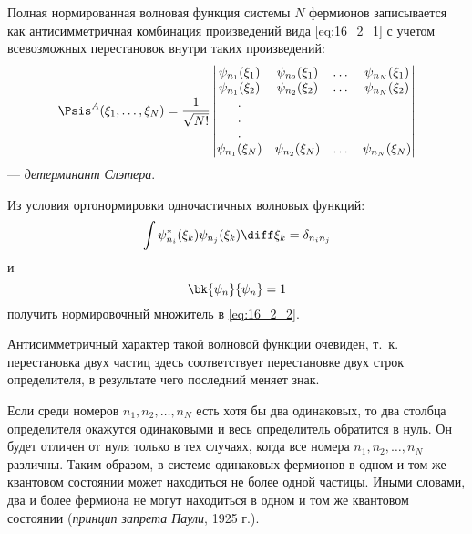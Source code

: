 Полная нормированная волновая функция системы $N$ фермионов записывается как антисимметричная комбинация произведений вида \eqref{eq:16_2_1} с учетом всевозможных перестановок внутри таких произведений:
\begin{equation}
\label{eq:16_2_2}
\Psis^A(\xi_1, \dots, \xi_N) = \frac{1}{\sqrt{N!}} \left |
  \begin{matrix} 
  \psi_{n_1}(\xi_1) & \psi_{n_2}(\xi_1) & \dots &  \psi_{n_N}(\xi_1) \\
  \psi_{n_1}(\xi_2) & \psi_{n_2}(\xi_2) & \dots &  \psi_{n_N}(\xi_2) \\
  .                                &                                  &    &                                    \\
  .                                &                                  &    &                                    \\
  .                                &                                  &    &                                    \\
  \psi_{n_1}(\xi_N) & \psi_{n_2}(\xi_N) & \dots &  \psi_{n_N}(\xi_N)
  \end{matrix} \right |
\end{equation}
--- {\em детерминант Слэтера}\footnotemark.
%
\begin{excr}

Из условия ортонормировки одночастичных волновых функций: 
$$
\int \psi_{n_i}^*(\xi_k) \psi_{n_j}(\xi_k) \diff\xi_k = \delta_{n_i n_j}
$$
и 
$$
\bk{\psi_n}{\psi_n} = 1
$$
получить нормировочный множитель в \eqref{eq:16_2_2}.
\end{excr}

Антисимметричный характер такой волновой функции очевиден, т.~к. перестановка двух частиц здесь соответствует перестановке двух строк определителя, в результате чего последний меняет знак.

Если среди номеров $n_1, n_2, \dots, n_N$ есть хотя бы два одинаковых, то два столбца определителя окажутся одинаковыми и весь определитель обратится в нуль. Он будет отличен от нуля только в тех случаях, когда все номера $n_1, n_2, \dots, n_N$ различны. Таким образом, в системе одинаковых фермионов в одном и том же квантовом состоянии может находиться не более одной частицы. Иными словами, два и более фермиона не могут находиться в одном и том же квантовом состоянии ({\em принцип запрета Паули}, 1925 г.).
